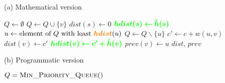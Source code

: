 \documentclass{report}[a4paper]
\theoremstyle{remark}
\begin{document}
\begin{center}
    \begin{algorithm}[H]
        \caption[A* algorithm]{A* algorithm\\Added lines in green, changed expressions in orange, relative to Dijkstra's algorithm (Algorithm \ref{alg-dijkstra})}
        \label{alg-astar}
        \begin{minipage}[t]{0.49\linewidth}
            (a) Mathematical version
            \begin{algorithmic}[1]
                    \State $Q \gets \emptyset$
                        \State $Q \gets Q \cup \{v\}$
                    \EndFor
                    \State $dist(s) \gets 0$
                    \State $\textcolor{green}{\bm{hdist(s) \gets \hat{h}(s)}}$
                        \State $u \gets \text{element of } Q \text{ with least } \textcolor{orange}{\bm{hdist}}(u)$
                        \State $Q \gets Q \backslash \{u\}$
                            \State $c' \gets c + w(u, v)$
                                \State $dist(v) \gets c'$
                                \State $\textcolor{green}{\bm{hdist(v) \gets c'+\hat{h}(v)}}$
                                \State $prev(v) \gets u$
                            \EndIf
                        \EndFor
                    \EndWhile
                    \State \Return $dist$, $prev$
                \EndFunction
            \end{algorithmic}
        \end{minipage}
        \begin{minipage}[t]{0.49\linewidth}
            (b) Programmatic version
            \begin{algorithmic}[1]
                    \State $Q = \Call{Min\_Priority\_Queue}{ }$
                    \EndFor

\end{algorithmic}
\end{minipage}
\end{algorithm}
\end{center}
\end{document}
